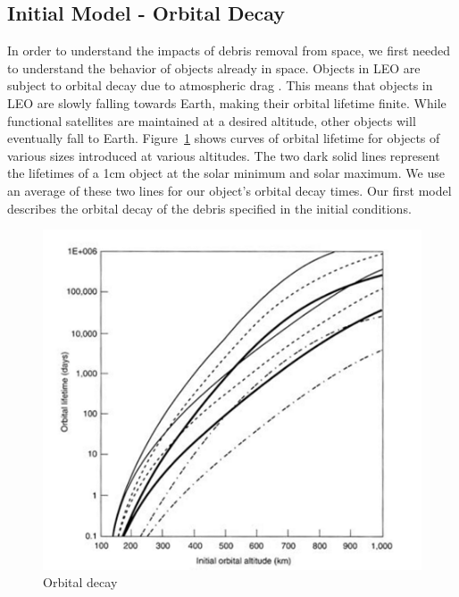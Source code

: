 \documentclass[pre,12pt]{revtex4-1}
\begin{document}
\subsection{Initial Model - Orbital Decay}
In order to understand the impacts of debris removal from space, we first needed to understand the behavior of objects already in space. Objects in LEO are subject to orbital decay due to atmospheric drag \cite{orbitalDebris}. This means that objects in LEO are slowly falling towards Earth, making their orbital lifetime finite. While functional satellites are maintained at a desired altitude, other objects will eventually fall to Earth. Figure~\ref{fig:orbital_decay} shows curves of orbital lifetime for objects of various sizes introduced at various altitudes. The two dark solid lines represent the lifetimes of a 1cm object at the solar minimum and solar maximum. We use an average of these two lines for our object's orbital decay times. Our first model describes the orbital decay of the debris specified in the initial conditions.

\begin{figure}
	\vspace{-18pt}
	\includegraphics[width=\linewidth]{"Figures/orbital_decay"}
	\caption{Orbital decay}
	\label{fig:orbital_decay}
\end{figure}
\end{document}
